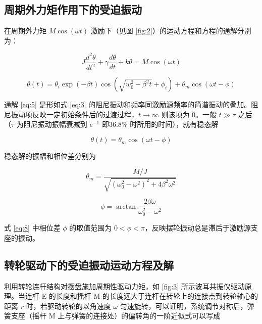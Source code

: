\documentclass[12pt,a4paper]{amsart}
\begin{document}
\subsection{周期外力矩作用下的受迫振动}

在周期外力矩 $M\cos(\omega t)$ 激励下（见图 \ref{fig:2}）的运动方程和方程的通解分别为：

\begin{equation}
	J\frac{d^2\theta}{dt^2} + \gamma\frac{d\theta}{dt} + k\theta = M\cos(\omega t) \label{eq:4}
\end{equation}

\begin{equation}
	\theta(t) = \theta_i \exp(-\beta t) \cos(\sqrt{w_0^2-\beta^2 t} + \phi_i) + \theta_m \cos(\omega t - \phi) \label{eq:5}
\end{equation}

通解 \ref{eq:5} 是形如式 \ref{eq:3} 的阻尼振动和频率同激励源频率的简谐振动的叠加。阻尼振动项反映一定初始条件后的过渡过程，$t \rightarrow \infty$ 则该项为 0。一般 $t \gg \tau$ 之后（$\tau$ 为阻尼振动振幅衰减到 $e^{-1}$ 即36.8\% 时所用的时间），就有稳态解

\begin{equation}
	\theta(t) = \theta_m \cos(\omega t - \phi) \label{eq:6}
\end{equation}

稳态解的振幅和相位差分别为

\begin{equation}
	\theta_m = \frac{M/J}{\sqrt{(\omega_0^2 - \omega^2)^2 + 4\beta^2\omega^2}} \label{eq:7}
\end{equation}

\begin{equation}
	\phi = \arctan\frac{2\beta\omega}{\omega_0^2 - \omega^2} \label{eq:8}
\end{equation}

式 \ref{eq:8} 中相位差 $\phi$ 的取值范围为 $0 < \phi < \pi$，反映摆轮振动总是滞后于激励源支座的振动。

\subsection{转轮驱动下的受迫振动运动方程及解}

利用转轮连杆结构对摆盘施加周期性驱动力矩，如 \ref{fig:3} 所示波耳共振仪驱动原理。当连杆 E 的长度和摇杆 M 的长度远大于连杆在转轮上的连接点到转轮轴心的距离 $r$ 时，若驱动转轮的以角速度 $\omega$ 匀速旋转，可以证明，系统调节对称后，弹簧支座（摇杆 M 上与弹簧的连接处）的偏转角的一阶近似式可以写成
\end{document}
